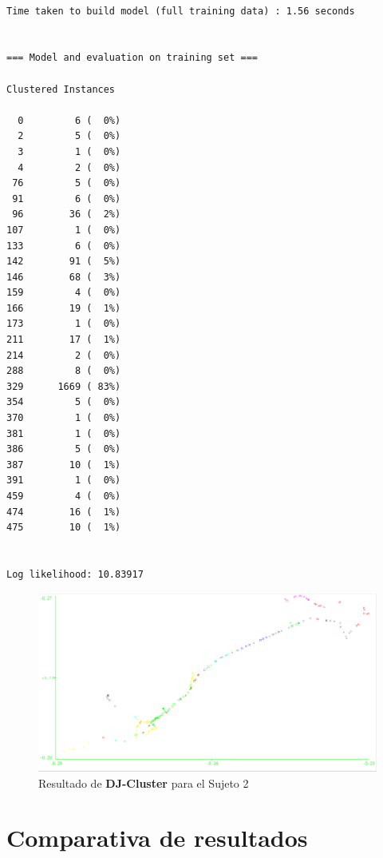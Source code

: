 \documentclass[a4paper, 12pt, spanish]{article}
\begin{document}
\begin{verbatim}

Time taken to build model (full training data) : 1.56 seconds


=== Model and evaluation on training set ===

Clustered Instances

  0         6 (  0%)
  2         5 (  0%)
  3         1 (  0%)
  4         2 (  0%)
 76         5 (  0%)
 91         6 (  0%)
 96        36 (  2%)
107         1 (  0%)
133         6 (  0%)
142        91 (  5%)
146        68 (  3%)
159         4 (  0%)
166        19 (  1%)
173         1 (  0%)
211        17 (  1%)
214         2 (  0%)
288         8 (  0%)
329      1669 ( 83%)
354         5 (  0%)
370         1 (  0%)
381         1 (  0%)
386         5 (  0%)
387        10 (  1%)
391         1 (  0%)
459         4 (  0%)
474        16 (  1%)
475        10 (  1%)


Log likelihood: 10.83917
\end{verbatim}

\begin{figure}[H]
	\includegraphics[scale=.5]{../comparativa/djClusterSujeto2.png}
	\caption{Resultado de \textbf{DJ-Cluster} para el Sujeto 2}
\end{figure}


\pagebreak
\section{Comparativa de resultados}
\end{document}

